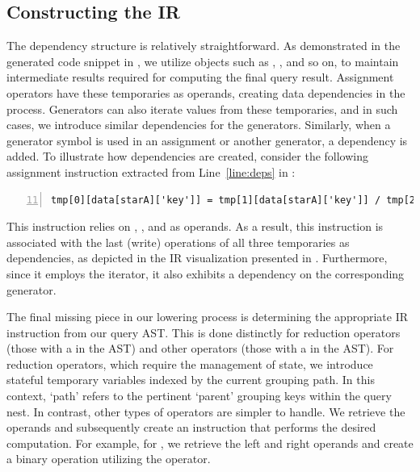 \documentclass[runningheads]{llncs}
\begin{document}
\subsection{Constructing the IR}
The dependency structure is relatively straightforward.
As demonstrated in the generated code snippet in , we utilize objects such
as , , and so on, to maintain intermediate results required
for computing the final query result.
Assignment operators have these temporaries as operands, creating data dependencies in the
process.
Generators can also iterate values from these temporaries, and in such cases, we introduce
similar dependencies for the generators.
Similarly, when a generator symbol is used in an assignment or another generator, a
dependency is added.
To illustrate how dependencies are created, consider the following assignment instruction
extracted from Line~\ref{line:deps} in :

\begin{lstlisting}[style=JavaScript, columns=flexible, numbers=left, firstnumber=11]
tmp[0][data[starA]['key']] = tmp[1][data[starA]['key']] / tmp[2]
\end{lstlisting}

This instruction relies on , , and  as operands.
As a result, this instruction is associated with the last (write) operations of all three
temporaries as dependencies, as depicted in the IR visualization presented in .
Furthermore, since it employs the  iterator, it also exhibits a dependency on the
corresponding generator.



The final missing piece in our lowering process is determining the appropriate
IR instruction from our query AST.
This is done distinctly for reduction operators (those with a
 in the AST) and other operators (those with a  in the AST).
For reduction operators, which require the management of state, we introduce stateful
temporary variables indexed by the current grouping path.
In this context, `path' refers to the pertinent `parent' grouping keys within the
query nest.
In contrast, other types of operators are simpler to handle.
We retrieve the operands and subsequently create an instruction that performs the
desired computation.
For example, for , we retrieve the left and right operands and create
a binary operation utilizing the \inline{+} operator.
\end{document}
